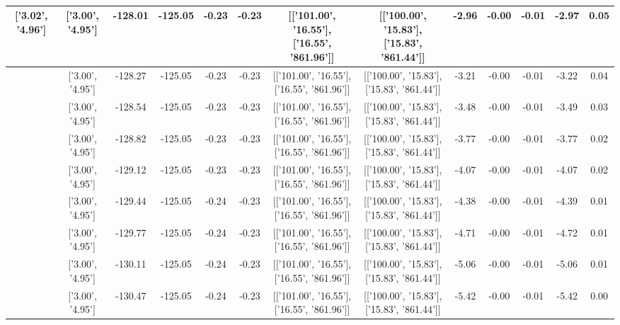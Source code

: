 \begin{table}[htbp]
\begin{adjustbox}{angle=90}
\begin{tabular}{|c|c|c|c|c|c|c|c|c|c|c|c|c|}
 ['3.02', '4.96'] & ['3.00', '4.95'] & -128.01 & -125.05 & -0.23 & -0.23 & [['101.00', '16.55'], ['16.55', '861.96']] & [['100.00', '15.83'], ['15.83', '861.44']] & -2.96 & -0.00 & -0.01 & -2.97 & 0.05\\ \hline
 ['3.02', '4.96'] & ['3.00', '4.95'] & -128.27 & -125.05 & -0.23 & -0.23 & [['101.00', '16.55'], ['16.55', '861.96']] & [['100.00', '15.83'], ['15.83', '861.44']] & -3.21 & -0.00 & -0.01 & -3.22 & 0.04\\ \hline
 ['3.02', '4.96'] & ['3.00', '4.95'] & -128.54 & -125.05 & -0.23 & -0.23 & [['101.00', '16.55'], ['16.55', '861.96']] & [['100.00', '15.83'], ['15.83', '861.44']] & -3.48 & -0.00 & -0.01 & -3.49 & 0.03\\ \hline
 ['3.02', '4.96'] & ['3.00', '4.95'] & -128.82 & -125.05 & -0.23 & -0.23 & [['101.00', '16.55'], ['16.55', '861.96']] & [['100.00', '15.83'], ['15.83', '861.44']] & -3.77 & -0.00 & -0.01 & -3.77 & 0.02\\ \hline
 ['3.02', '4.96'] & ['3.00', '4.95'] & -129.12 & -125.05 & -0.23 & -0.23 & [['101.00', '16.55'], ['16.55', '861.96']] & [['100.00', '15.83'], ['15.83', '861.44']] & -4.07 & -0.00 & -0.01 & -4.07 & 0.02\\ \hline
 ['3.03', '4.96'] & ['3.00', '4.95'] & -129.44 & -125.05 & -0.24 & -0.23 & [['101.00', '16.55'], ['16.55', '861.96']] & [['100.00', '15.83'], ['15.83', '861.44']] & -4.38 & -0.00 & -0.01 & -4.39 & 0.01\\ \hline
 ['3.03', '4.96'] & ['3.00', '4.95'] & -129.77 & -125.05 & -0.24 & -0.23 & [['101.00', '16.55'], ['16.55', '861.96']] & [['100.00', '15.83'], ['15.83', '861.44']] & -4.71 & -0.00 & -0.01 & -4.72 & 0.01\\ \hline
 ['3.03', '4.96'] & ['3.00', '4.95'] & -130.11 & -125.05 & -0.24 & -0.23 & [['101.00', '16.55'], ['16.55', '861.96']] & [['100.00', '15.83'], ['15.83', '861.44']] & -5.06 & -0.00 & -0.01 & -5.06 & 0.01\\ \hline
 ['3.03', '4.96'] & ['3.00', '4.95'] & -130.47 & -125.05 & -0.24 & -0.23 & [['101.00', '16.55'], ['16.55', '861.96']] & [['100.00', '15.83'], ['15.83', '861.44']] & -5.42 & -0.00 & -0.01 & -5.42 & 0.00\\ \hline
            \end{tabular}
        \end{adjustbox}
        \caption{}
        \label{}
    \end{table}
    